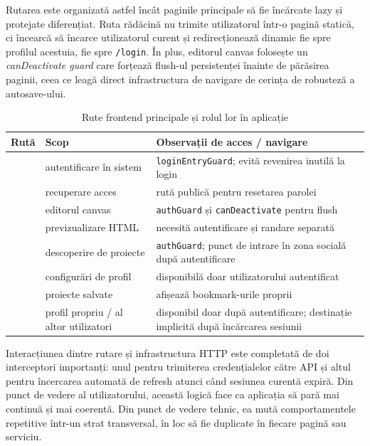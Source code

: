 Rutarea este organizată astfel încât paginile principale să fie încărcate lazy și protejate diferențiat. Ruta rădăcină nu trimite utilizatorul într-o pagină statică, ci încearcă să încarce utilizatorul curent și redirecționează dinamic fie spre profilul acestuia, fie spre \texttt{/login}. În plus, editorul canvas folosește un \textit{canDeactivate guard} care forțează flush-ul persistenței înainte de părăsirea paginii, ceea ce leagă direct infrastructura de navigare de cerința de robusteză a autosave-ului.

\begin{table}[H]
  \centering
  \caption{Rute frontend principale și rolul lor în aplicație}
  \label{tab:rute-frontend}
  \renewcommand{\arraystretch}{1.15}
  \begin{tabularx}{\textwidth}{>{\RaggedRight\arraybackslash}p{4.2cm}>{\RaggedRight\arraybackslash}p{4.1cm}Y}
    \toprule
    \textbf{Rută} & \textbf{Scop} & \textbf{Observații de acces / navigare} \\
    \midrule
     & autentificare în sistem & \texttt{loginEntryGuard}; evită revenirea inutilă la login \\
     & recuperare acces & rută publică pentru resetarea parolei \\
     & editorul canvas & \texttt{authGuard} și \texttt{canDeactivate} pentru flush \\
     & previzualizare HTML & necesită autentificare și randare separată \\
     & descoperire de proiecte & \texttt{authGuard}; punct de intrare în zona socială după autentificare \\
     & configurări de profil & disponibilă doar utilizatorului autentificat \\
     & proiecte salvate & afișează bookmark-urile proprii \\
     & profil propriu / al altor utilizatori & disponibil doar după autentificare; destinație implicită după încărcarea sesiunii \\
    \bottomrule
  \end{tabularx}
\end{table}

Interacțiunea dintre rutare și infrastructura HTTP este completată de doi interceptori importanți: unul pentru trimiterea credențialelor către API și altul pentru încercarea automată de refresh atunci când sesiunea curentă expiră. Din punct de vedere al utilizatorului, această logică face ca aplicația să pară mai continuă și mai coerentă. Din punct de vedere tehnic, ea mută comportamentele repetitive într-un strat transversal, în loc să fie duplicate în fiecare pagină sau serviciu.

